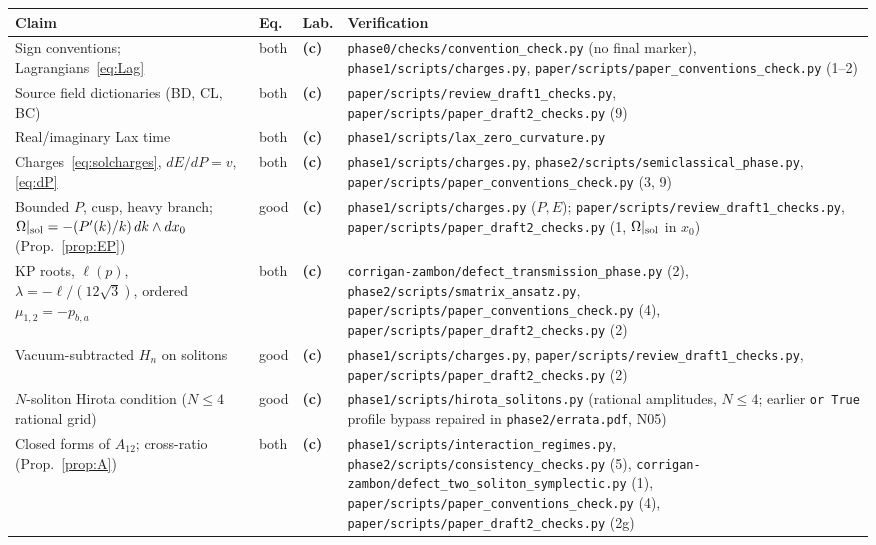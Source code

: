 \documentclass[11pt,a4paper]{article}
\newcommand{\lab}[1]{{\normalfont\sffamily\footnotesize\bfseries(#1)}}
\newcommand{\Lc}{\lab{c}}
\newcommand{\scr}[1]{\nolinkurl{#1}}
\theoremstyle{remark}
\begin{document}
\begingroup\small\setlength{\tabcolsep}{4pt}
\begin{longtable}{@{}>{\raggedright}p{5.4cm}>{\raggedright}p{1.3cm}>{\raggedright}p{0.75cm}>{\raggedright\arraybackslash}p{6.55cm}@{}}
\toprule
Claim & Eq. & Lab. & Verification\\\midrule\endhead
Sign conventions; Lagrangians~\eqref{eq:Lag} & both & \Lc & \scr{phase0/checks/convention_check.py} (no final marker), \scr{phase1/scripts/charges.py}, \scr{paper/scripts/paper_conventions_check.py} (1--2)\\
Source field dictionaries (BD, CL, BC) & both & \Lc & \scr{paper/scripts/review_draft1_checks.py}, \scr{paper/scripts/paper_draft2_checks.py} (9)\\
Real/imaginary Lax time & both & \Lc & \scr{phase1/scripts/lax_zero_curvature.py}\\
Charges~\eqref{eq:solcharges}, $dE/dP=v$, \eqref{eq:dP} & both & \Lc & \scr{phase1/scripts/charges.py}, \scr{phase2/scripts/semiclassical_phase.py}, \scr{paper/scripts/paper_conventions_check.py} (3, 9)\\
Bounded $P$, cusp, heavy branch; $\Omega|_{\rm sol}=-(P'(k)/k)\,dk\wedge dx_0$ (Prop.~\ref{prop:EP}) & good & \Lc & \scr{phase1/scripts/charges.py} ($P,E$); \scr{paper/scripts/review_draft1_checks.py}, \scr{paper/scripts/paper_draft2_checks.py} (1, $\Omega|_{\rm sol}$ in $x_0$)\\
KP roots, $\ell(p)$, $\lambda=-\ell/(12\sqrt3)$, ordered $\mu_{1,2}=-p_{b,a}$ & both & \Lc & \scr{corrigan-zambon/defect_transmission_phase.py} (2), \scr{phase2/scripts/smatrix_ansatz.py}, \scr{paper/scripts/paper_conventions_check.py} (4), \scr{paper/scripts/paper_draft2_checks.py} (2)\\
Vacuum-subtracted $H_n$ on solitons & good & \Lc & \scr{phase1/scripts/charges.py}, \scr{paper/scripts/review_draft1_checks.py}, \scr{paper/scripts/paper_draft2_checks.py} (2)\\
$N$-soliton Hirota condition ($N\le4$ rational grid) & good & \Lc & \scr{phase1/scripts/hirota_solitons.py} (rational amplitudes, $N\le4$; earlier \texttt{or True} profile bypass repaired in \scr{phase2/errata.pdf}, N05)\\
Closed forms of $A_{12}$; cross-ratio (Prop.~\ref{prop:A}) & both & \Lc & \scr{phase1/scripts/interaction_regimes.py}, \scr{phase2/scripts/consistency_checks.py} (5), \scr{corrigan-zambon/defect_two_soliton_symplectic.py} (1), \scr{paper/scripts/paper_conventions_check.py} (4), \scr{paper/scripts/paper_draft2_checks.py} (2g)\\

\end{longtable}
\end{document}
